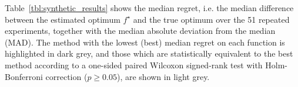 \documentclass[
dvipsnames, table,   %
format=acmsmall,     %
anonymous=true,      %
authorversion=false, %
]{acmart}
\makeatletter
\newcommand{\fstar}{f^\star}
\newcommand*{\ie}{i.e.\@\xspace}
\makeatother
\begin{document}
Table~\ref{tbl:synthetic_results} shows the median regret, \ie the median
difference between the estimated optimum $\fstar$ and the true optimum %
over the 51 repeated experiments, together with the median
absolute deviation from the median (MAD). The method with the lowest (best)
median regret on each function is highlighted in dark grey, and those which are
statistically equivalent to the best method according to a one-sided paired 
Wilcoxon signed-rank test \citep{knowles:testing} with Holm-Bonferroni correction
\citep{holm:test} ($p\geq0.05$), are shown in light grey.

\begin{table}[t]
\setlength{\tabcolsep}{2pt}
\end{table}
\end{document}
